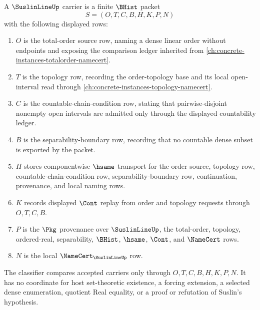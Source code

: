\begin{definition}
\label{def:suslin-line-carrier}
A $\SuslinLineUp$ carrier is a finite $\BHist$ packet
$$
S=(O,T,C,B,H,K,P,N)
$$
with the following displayed rows:
\begin{enumerate}
\item $O$ is the total-order source row, naming a dense linear order without endpoints and exposing the comparison ledger inherited from \autoref{ch:concrete-instances-totalorder-namecert}.
\item $T$ is the topology row, recording the order-topology base and its local open-interval read through \autoref{ch:concrete-instances-topology-namecert}.
\item $C$ is the countable-chain-condition row, stating that pairwise-disjoint nonempty open intervals are admitted only through the displayed countability ledger.
\item $B$ is the separability-boundary row, recording that no countable dense subset is exported by the packet.
\item $H$ stores componentwise $\hsame$ transport for the order source, topology row, countable-chain-condition row, separability-boundary row, continuation, provenance, and local naming rows.
\item $K$ records displayed $\Cont$ replay from order and topology requests through $O,T,C,B$.
\item $P$ is the $\Pkg$ provenance over $\SuslinLineUp$, the total-order, topology, ordered-real, separability, $\BHist$, $\hsame$, $\Cont$, and $\NameCert$ rows.
\item $N$ is the local $\NameCert_{\SuslinLineUp}$ row.
\end{enumerate}
The classifier compares accepted carriers only through $O,T,C,B,H,K,P,N$. It has no coordinate for host set-theoretic existence, a forcing extension, a selected dense enumeration, quotient Real equality, or a proof or refutation of Suslin's hypothesis.
\end{definition}

